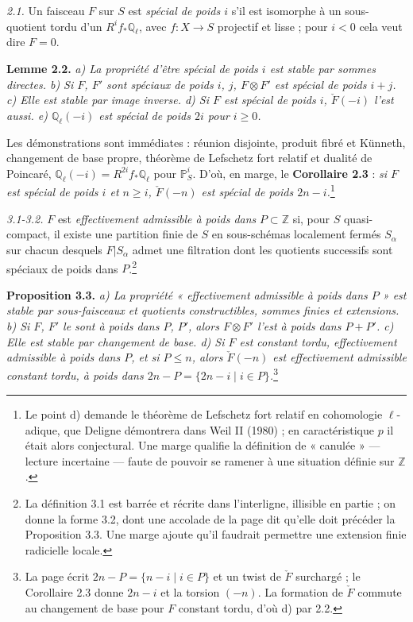 \documentclass[11pt,a4paper]{article}
\begin{document}
\emph{2.1.} Un faisceau $F$ sur $S$ est \emph{spécial de poids $i$} s'il est
isomorphe à un sous-quotient tordu d'un $R^{i}f_{*}\mathbb{Q}_{\ell}$, avec $f
\colon X \to S$ projectif et lisse ; pour $i < 0$ cela veut dire $F = 0$.

\textbf{Lemme 2.2.} \emph{a) La propriété d'être spécial de poids $i$ est stable
par sommes directes. b) Si $F$, $F'$ sont spéciaux de poids $i$, $j$, $F \otimes F'$
est spécial de poids $i+j$. c) Elle est stable par image inverse. d) Si $F$ est
spécial de poids $i$, $\check{F}(-i)$ l'est aussi. e) $\mathbb{Q}_{\ell}(-i)$ est
spécial de poids $2i$ pour $i \geqslant 0$.}

Les démonstrations sont immédiates : réunion disjointe, produit fibré et Künneth,
changement de base propre, théorème de Lefschetz fort relatif et dualité de
Poincaré, $\mathbb{Q}_{\ell}(-i) = R^{2i}f_{*}\mathbb{Q}_{\ell}$ pour $\mathbb{P}^{i}_{S}$.
D'où, en marge, le \textbf{Corollaire 2.3} : \emph{si $F$ est spécial de poids $i$
et $n \geqslant i$, $\check{F}(-n)$ est spécial de poids $2n-i$.}\footnote{Le point
d) demande le théorème de Lefschetz fort relatif en cohomologie $\ell$-adique, que
Deligne démontrera dans Weil II (1980) ; en caractéristique $p$ il était alors
conjectural. Une marge qualifie la définition de « canulée » --- lecture
incertaine --- faute de pouvoir se ramener à une situation définie sur
$\mathbb{Z}$.}

\emph{3.1-3.2.} $F$ est \emph{effectivement admissible à poids dans} $P \subset
\mathbb{Z}$ si, pour $S$ quasi-compact, il existe une partition finie de $S$ en
sous-schémas localement fermés $S_{\alpha}$ sur chacun desquels $F|S_{\alpha}$
admet une filtration dont les quotients successifs sont spéciaux de poids dans
$P$.\footnote{La définition 3.1 est barrée et récrite dans l'interligne, illisible
en partie ; on donne la forme 3.2, dont une accolade de la page dit qu'elle doit
précéder la Proposition 3.3. Une marge ajoute qu'il faudrait permettre une
extension finie radicielle locale.}

\textbf{Proposition 3.3.} \emph{a) La propriété « effectivement admissible à poids
dans $P$ » est stable par sous-faisceaux et quotients constructibles, sommes finies
et extensions. b) Si $F$, $F'$ le sont à poids dans $P$, $P'$, alors $F \otimes F'$
l'est à poids dans $P + P'$. c) Elle est stable par changement de base. d) Si $F$
est constant tordu, effectivement admissible à poids dans $P$, et si $P \leqslant
n$, alors $\check{F}(-n)$ est effectivement admissible constant tordu, à poids dans
$2n - P = \{2n - i \mid i \in P\}$.}\footnote{La page écrit $2n - P = \{n - i \mid i
\in P\}$ et un twist de $\check{F}$ surchargé ; le Corollaire 2.3 donne $2n - i$ et
la torsion $(-n)$. La formation de $\check{F}$ commute au changement de base pour
$F$ constant tordu, d'où d) par 2.2.}
\end{document}
